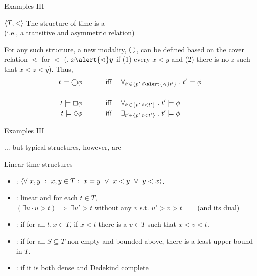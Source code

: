 \documentclass{beamer}
\begin{document}
\begin{slide}{Examples III}\label{s:18a}
\small

\begin{block}{$\mathopen{\langle}T,<\mathclose{\rangle}$}
The structure of time is a  \\ (i.e., a transitive and asymmetric relation)
\vspace{0.3cm}

\noindent
For any such structure, a new modality, $\bigcirc$, can be defined based on the \alert{cover} relation \alert{$\lessdot$} for $<$ 
(\ie, $x\alert{\lessdot} y$ if (1) every $x<y$ and (2) there is no $z$ such that $x<z<y$).
Thus,
\begin{align*}
t  \models \nexts \phi &\text{ ~~~~~~~~ \textsf{iff} ~~~} 
\universal{t' \in \setdef{p'}{t \alert{\lessdot} t' }}{t' \models \phi} \\ &\\
t  \models \always \phi &\text{ ~~~~~~~~ \textsf{iff} ~~~} 
\universal{t' \in \setdef{p'}{t < t' }}{t' \models \phi} \\
t  \models \eventual \phi &\text{ ~~~~~~~~ \textsf{iff} ~~~} 
\existential{t' \in \setdef{p'}{t < t' }}{t' \models \phi} \\
\end{align*}
\end{block}

\end{slide}

\begin{slide}{Examples III}\label{s:18b}
\small

... but typical structures, however, are 

\begin{block}{Linear time structures}
\begin{itemize}
\item {}: $\rcb{\forall}{x,y}{x,y \in T}{x=y ~\lor~ x<y ~\lor~ y<x}$. %
\item {}: linear and for each $t\in T$, \\
$(\exists u \cdot u>t) ~\Rightarrow~ \exists u'>t$ without any $v$ s.t. $u'>v>t$ ~~~ (and its dual)
\item {}: if for all $t,x \in T$, if $x<t$ there is a $v\in T$ such that $x<v<t$.
\item {}: if for all $S\subseteq T$ non-empty and bounded above, there is a least upper bound in $T$.
\item {}: if it is both dense and Dedekind complete
\end{itemize}
\end{block}
\end{slide}
\end{document}
